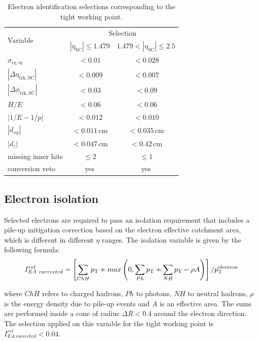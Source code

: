 \begin{table}[htb]
\caption{Electron identification selections corresponding to the tight working point.}\label{tab:tightele}
\centering
\begin{tabular}{lcc}
\toprule
\multirow{2}{*}{Variable} & \multicolumn{2}{c}{Selection}\\
 & $|\eta_\mathrm{SC}|\leq 1.479$ & $1.479 < |\eta_\mathrm{SC}| \leq 2.5$ \\
\midrule
$\sigma_{i\eta,i\eta}$ & $<0.01$ & $<0.028$ \\
$|\Delta\eta_\mathrm{trk,SC}|$ & $<0.009$ & $<0.007$ \\
$|\Delta\phi_\mathrm{trk,SC}|$ & $<0.03$ & $<0.09$ \\
$H/E$ & $<0.06$ & $<0.06$ \\
$|1/E - 1/p|$ & $<0.012$ & $<0.010$ \\
$|d_{xy}|$ & $<0.011$\,cm & $<0.035$\,cm\\
$|d_{z}|$ & $<0.047$\,cm & $<0.42$\,cm\\
missing inner hits & $\leq 2$ & $\leq 1$\\
conversion veto & yes & yes \\
\bottomrule
\end{tabular}
\end{table}

\subsection{Electron isolation}
Selected electrons are required to pass an isolation requirement that includes a pile-up mitigation correction based on the electron effective catchment area, which is different in different $\eta$ ranges. The isolation variable is given by the following formula:
\begin{equation}
I^{rel}_{EA~corrected} = \left[ \sum_{ChH}p_\mathrm{T} + max\left( 0, \sum_{Ph}p_\mathrm{T} + \sum_{NH}p_\mathrm{T} - \rho A \right) \right]/p_\mathrm{T}^\mathrm{electron} \,
\end{equation}

\noindent where $ChH$ refers to charged hadrons, $Ph$ to photons, $NH$ to neutral hadrons, $\rho$ is the energy density due to pile-up events and $A$ is an effective area. The sums are performed inside a cone of radius $\Delta R < 0.4$ around the electron direction. The selection applied on this variable for the tight working point is $I^{rel}_{EA~corrected} < 0.04$.

